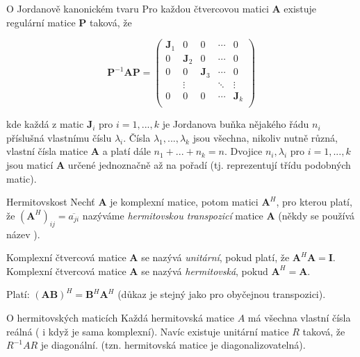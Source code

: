 \begin{vetaN}{O Jordanově kanonickém tvaru}
Pro každou čtvercovou matici \textbf{A} existuje regulární matice \textbf{P} taková, že

$$\textbf{P}^{-1}\textbf{A}\textbf{P} = \begin{pmatrix}
  \textbf{J}_1 & 0 & 0 & \cdots & 0 \\
  0 & \textbf{J}_2 & 0 & \cdots & 0 \\
  0 & 0 & \textbf{J}_3 & \cdots & 0 \\
   & \vdots &  & \ddots & \vdots \\
  0 & 0 & 0 & \cdots & \textbf{J}_k \\
\end{pmatrix}$$

kde každá z matic $\textbf{J}_i$ pro $i=1,...,k$ je Jordanova buňka nějakého řádu $n_i$ příslušná vlastnímu číslu $\lambda_i$. Čísla $\lambda_1,...,\lambda_k$ jsou všechna, nikoliv nutně různá, vlastní čísla matice \textbf{A} a platí dále $n_1 + ... + n_k = n$. Dvojice $n_i,\lambda_i$ pro $i=1,...,k$ jsou maticí \textbf{A} určené jednoznačně až na pořadí (tj. reprezentují třídu podobných matic).
\end{vetaN}


\begin{definiceN}{Hermitovskost}
Nechť \textbf{A} je komplexní matice, potom matici $\textbf{A}^H$, pro kterou platí, že $(\textbf{A}^H)_{ij} = \overline{a_{ji}}$ nazýváme 
\emph{hermitovskou transpozicí} matice \textbf{A} (někdy se používá název ). 

Komplexní čtvercová matice \textbf{A} se nazývá \emph{unitární}, pokud platí, že $\textbf{A}^H\textbf{A} = \textbf{I}$. 
Komplexní čtvercová matice \textbf{A} se nazývá \emph{hermitovská}, pokud $\textbf{A}^H = \textbf{A}$.
\end{definiceN}

\begin{pozorovani}
Platí: $(\textbf{AB})^H = \textbf{B}^H\textbf{A}^H$ (důkaz je stejný jako pro obyčejnou transpozici). 
\end{pozorovani}

\def\Complex{\mathbb{C}}
\def\Real{\mathbb{R}}

\begin{vetaN}{O hermitovských maticích} 
Každá hermitovská matice $A$ má všechna vlastní čísla reálná ( i když je sama komplexní). Navíc existuje unitární matice $R$ taková, že $R^{-1}A R$ je diagonální. (tzn. hermitovská matice je diagonalizovatelná).
\end{vetaN}

